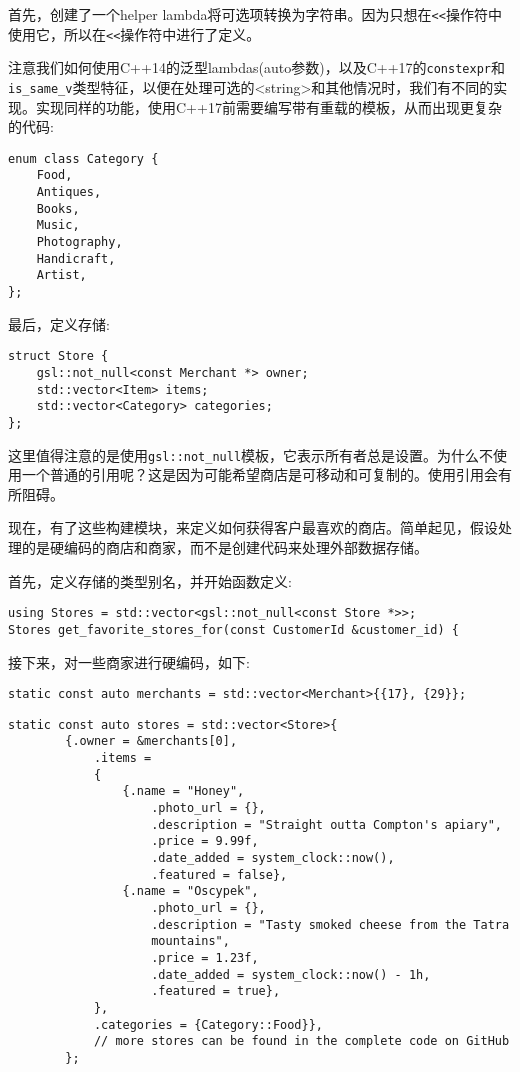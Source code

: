 首先，创建了一个helper lambda将可选项转换为字符串。因为只想在\texttt{<<}操作符中使用它，所以在\texttt{<<}操作符中进行了定义。

注意我们如何使用C++14的泛型lambdas(auto参数)，以及C++17的\texttt{constexpr}和\texttt{is\_same\_v}类型特征，以便在处理可选的<string>和其他情况时，我们有不同的实现。实现同样的功能，使用C++17前需要编写带有重载的模板，从而出现更复杂的代码:

\begin{lstlisting}[style=styleCXX]
enum class Category {
	Food,
	Antiques,
	Books,
	Music,
	Photography,
	Handicraft,
	Artist,
};
\end{lstlisting}

最后，定义存储:

\begin{lstlisting}[style=styleCXX]
struct Store {
	gsl::not_null<const Merchant *> owner;
	std::vector<Item> items;
	std::vector<Category> categories;
};
\end{lstlisting}

这里值得注意的是使用\texttt{gsl::not\_null}模板，它表示所有者总是设置。为什么不使用一个普通的引用呢？这是因为可能希望商店是可移动和可复制的。使用引用会有所阻碍。

现在，有了这些构建模块，来定义如何获得客户最喜欢的商店。简单起见，假设处理的是硬编码的商店和商家，而不是创建代码来处理外部数据存储。

首先，定义存储的类型别名，并开始函数定义:

\begin{lstlisting}[style=styleCXX]
using Stores = std::vector<gsl::not_null<const Store *>>;
Stores get_favorite_stores_for(const CustomerId &customer_id) {
\end{lstlisting}

接下来，对一些商家进行硬编码，如下:

\begin{lstlisting}[style=styleCXX]
	static const auto merchants = std::vector<Merchant>{{17}, {29}};
\end{lstlisting}


\begin{lstlisting}[style=styleCXX]
	static const auto stores = std::vector<Store>{
		{.owner = &merchants[0],
			.items =
			{
				{.name = "Honey",
					.photo_url = {},
					.description = "Straight outta Compton's apiary",
					.price = 9.99f,
					.date_added = system_clock::now(),
					.featured = false},
				{.name = "Oscypek",
					.photo_url = {},
					.description = "Tasty smoked cheese from the Tatra
					mountains",
					.price = 1.23f,
					.date_added = system_clock::now() - 1h,
					.featured = true},
			},
			.categories = {Category::Food}},
			// more stores can be found in the complete code on GitHub
		};
\end{lstlisting}

